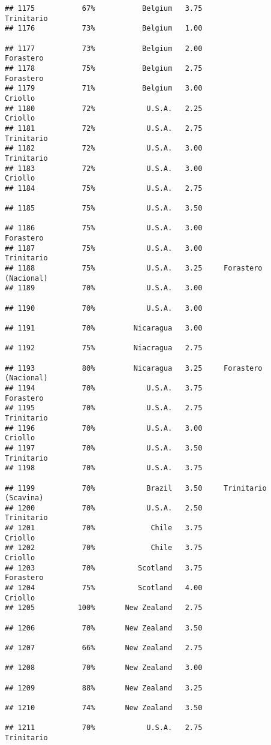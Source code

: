 \documentclass[
]{article}
\begin{document}
\begin{verbatim}
## 1175           67%           Belgium   3.75               Trinitario
## 1176           73%           Belgium   1.00                         
## 1177           73%           Belgium   2.00                Forastero
## 1178           75%           Belgium   2.75                Forastero
## 1179           71%           Belgium   3.00                  Criollo
## 1180           72%            U.S.A.   2.25                  Criollo
## 1181           72%            U.S.A.   2.75               Trinitario
## 1182           72%            U.S.A.   3.00               Trinitario
## 1183           72%            U.S.A.   3.00                  Criollo
## 1184           75%            U.S.A.   2.75                         
## 1185           75%            U.S.A.   3.50                         
## 1186           75%            U.S.A.   3.00                Forastero
## 1187           75%            U.S.A.   3.00               Trinitario
## 1188           75%            U.S.A.   3.25     Forastero (Nacional)
## 1189           70%            U.S.A.   3.00                         
## 1190           70%            U.S.A.   3.00                         
## 1191           70%         Nicaragua   3.00                         
## 1192           75%         Niacragua   2.75                         
## 1193           80%         Nicaragua   3.25     Forastero (Nacional)
## 1194           70%            U.S.A.   3.75                Forastero
## 1195           70%            U.S.A.   2.75               Trinitario
## 1196           70%            U.S.A.   3.00                  Criollo
## 1197           70%            U.S.A.   3.50               Trinitario
## 1198           70%            U.S.A.   3.75                         
## 1199           70%            Brazil   3.50     Trinitario (Scavina)
## 1200           70%            U.S.A.   2.50               Trinitario
## 1201           70%             Chile   3.75                  Criollo
## 1202           70%             Chile   3.75                  Criollo
## 1203           70%          Scotland   3.75                Forastero
## 1204           75%          Scotland   4.00                  Criollo
## 1205          100%       New Zealand   2.75                         
## 1206           70%       New Zealand   3.50                         
## 1207           66%       New Zealand   2.75                         
## 1208           70%       New Zealand   3.00                         
## 1209           88%       New Zealand   3.25                         
## 1210           74%       New Zealand   3.50                         
## 1211           70%            U.S.A.   2.75               Trinitario

\end{verbatim}
\end{document}
